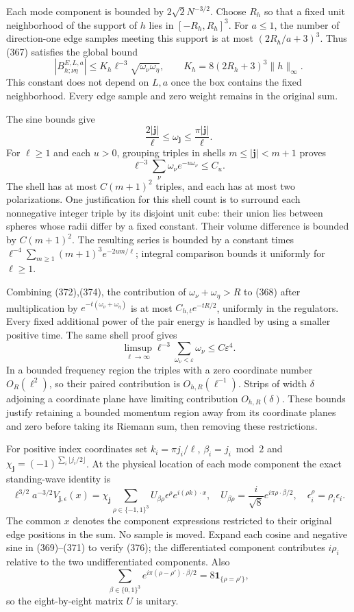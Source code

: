 \documentclass[
  11pt,
]{article}
\begin{document}
Each mode component is bounded by \(2\sqrt2N^{-3/2}\). Choose \(R_h\) so
that a fixed unit neighborhood of the support of \(h\) lies in
\([-R_h,R_h]^3\). For \(a\le1\), the number of direction-one edge
samples meeting this support is at most \((2R_h/a+3)^3\). Thus (367)
satisfies the global bound \[
 |B^{E,L,a}_{h;\nu\eta}|
 \le K_h\ell^{-3}\sqrt{\omega_\nu\omega_\eta},\qquad
 K_h=8(2R_h+3)^3\|h\|_\infty .
 \tag{372}
\] This constant does not depend on \(L,a\) once the box contains the
fixed neighborhood. Every edge sample and zero weight remains in the
original sum.

The sine bounds give \[
 \frac{2|\boldsymbol j|}{\ell}
      \le\omega_{\boldsymbol j}
      \le\frac{\pi|\boldsymbol j|}{\ell}.
 \tag{373}
\] For \(\ell\ge1\) and each \(u>0\), grouping triples in shells
\(m\le|\boldsymbol j|<m+1\) proves \[
 \ell^{-3}\sum_\nu\omega_\nu e^{-u\omega_\nu}\le C_u.
 \tag{374}
\] The shell has at most \(C(m+1)^2\) triples, and each has at most two
polarizations. One justification for this shell count is to surround
each nonnegative integer triple by its disjoint unit cube: their union
lies between spheres whose radii differ by a fixed constant. Their
volume difference is bounded by \(C(m+1)^2\). The resulting series is
bounded by a constant times
\(\ell^{-4}\sum_{m\ge1}(m+1)^3e^{-2um/\ell}\); integral comparison
bounds it uniformly for \(\ell\ge1\).

Combining (372),(374), the contribution of \(\omega_\nu+\omega_\eta>R\)
to (368) after multiplication by \(e^{-t(\omega_\nu+\omega_\eta)}\) is
at most \(C_{h,t}e^{-tR/2}\), uniformly in the regulators. Every fixed
additional power of the pair energy is handled by using a smaller
positive time. The same shell proof gives \[
 \limsup_{\ell\to\infty}\ell^{-3}
       \sum_{\omega_\nu<\varepsilon}\omega_\nu
       \le C\varepsilon^4.
 \tag{375}
\] In a bounded frequency region the triples with a zero coordinate
number \(O_R(\ell^2)\), so their paired contribution is
\(O_{h,R}(\ell^{-1})\). Strips of width \(\delta\) adjoining a
coordinate plane have limiting contribution \(O_{h,R}(\delta)\). These
bounds justify retaining a bounded momentum region away from its
coordinate planes and zero before taking its Riemann sum, then removing
these restrictions.

For positive index coordinates set \(k_i=\pi j_i/\ell\),
\(\beta_i=j_i\bmod2\) and
\(\chi_{\boldsymbol j}=(-1)^{\sum_i\lfloor j_i/2\rfloor}\). At the
physical location of each mode component the exact standing-wave
identity is \[
 \ell^{3/2}a^{-3/2}V_{\boldsymbol j,\epsilon}(x)
 =\chi_{\boldsymbol j}\sum_{\rho\in\{-1,1\}^3}
       U_{\beta\rho}\epsilon^\rho e^{i(\rho k)\cdot x},
 \quad
 U_{\beta\rho}=\frac{i}{\sqrt8}e^{i\pi\rho\cdot\beta/2},
 \quad \epsilon_i^\rho=\rho_i\epsilon_i.
 \tag{376}
\] The common \(x\) denotes the component expressions restricted to
their original edge positions in the sum. No sample is moved. Expand
each cosine and negative sine in (369)--(371) to verify (376); the
differentiated component contributes \(i\rho_i\) relative to the two
undifferentiated components. Also \[
 \sum_{\beta\in\{0,1\}^3}
 e^{i\pi(\rho-\rho')\cdot\beta/2}
 =8\mathbf1_{\{\rho=\rho'\}},
 \tag{377}
\] so the eight-by-eight matrix \(U\) is unitary.
\end{document}
